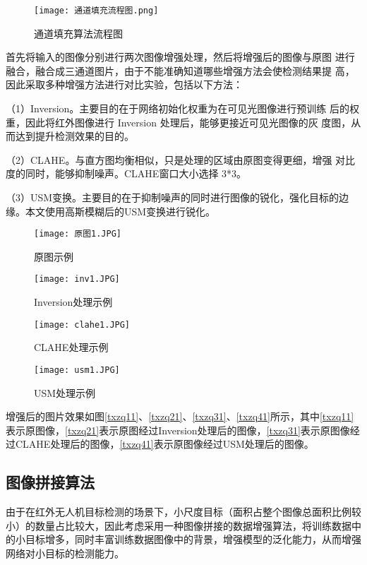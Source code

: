 \begin{figure}[h]
  \centering
  \texttt{[image: 通道填充流程图.png]}
  \caption{通道填充算法流程图}
  \label{tdtc}
\end{figure}

首先将输入的图像分别进行两次图像增强处理，然后将增强后的图像与原图
进行融合，融合成三通道图片，由于不能准确知道哪些增强方法会使检测结果提
高，因此采取多种增强方法进行对比实验，包括以下方法：

（1）Inversion。主要目的在于网络初始化权重为在可见光图像进行预训练
后的权重，因此将红外图像进行 Inversion 处理后，能够更接近可见光图像的灰
度图，从而达到提升检测效果的目的。

（2）CLAHE。与直方图均衡相似，只是处理的区域由原图变得更细，增强
对比度的同时，能够抑制噪声。CLAHE窗口大小选择 3*3。

（3）USM变换。主要目的在于抑制噪声的同时进行图像的锐化，强化目标的边缘。本文使用高斯模糊后的USM变换进行锐化。

\begin{figure}[htbp]
	\centering
	\begin{minipage}{0.49\linewidth}
		\centering
		\texttt{[image: 原图1.JPG]}
		\caption{原图示例}
		\label{txzq11}%
	\end{minipage}
	\begin{minipage}{0.49\linewidth}
		\centering
		\texttt{[image: inv1.JPG]}
		\caption{Inversion处理示例}
		\label{txzq21}%
	\end{minipage}
	
	\begin{minipage}{0.49\linewidth}
		\centering
		\texttt{[image: clahe1.JPG]}
		\caption{CLAHE处理示例}
		\label{txzq31}%
	\end{minipage}
	\begin{minipage}{0.49\linewidth}
		\centering
		\texttt{[image: usm1.JPG]}
		\caption{USM处理示例}
		\label{txzq41}%
	\end{minipage}
  \label{txzq}
\end{figure}

增强后的图片效果如图\ref{txzq11}、\ref{txzq21}、\ref{txzq31}、\ref{txzq41}所示，其中\ref{txzq11}表示原图像，\ref{txzq21}表示原图经过Inversion处理后的图像，\ref{txzq31}表示原图像经过CLAHE处理后的图像，\ref{txzq41}表示原图像经过USM处理后的图像。

\subsection{图像拼接算法}
由于在红外无人机目标检测的场景下，小尺度目标（面积占整个图像总面积比例较小）的数量占比较大，因此考虑采用一种图像拼接的数据增强算法，将训练数据中的小目标增多，同时丰富训练数据图像中的背景，增强模型的泛化能力，从而增强网络对小目标的检测能力。

